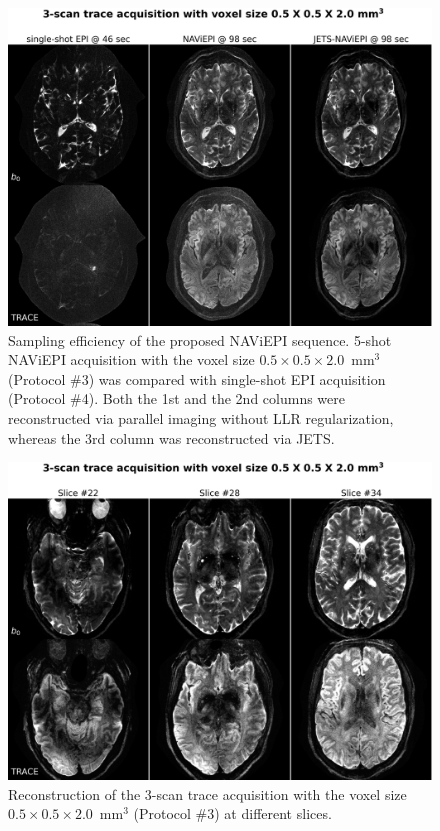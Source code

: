 \documentclass[preprint,12pt,authoryear,review]{elsarticle}
\begin{document}
    \begin{figure}
        \centering
        \includegraphics[width=\textwidth]{../figures/fig6.png}
        \caption{Sampling efficiency of the proposed NAViEPI sequence.
        5-shot NAViEPI acquisition with the voxel size
        $0.5\times0.5\times2.0$~mm$^3$ (Protocol \#3)
        was compared with single-shot EPI acquisition (Protocol \#4).
        Both the 1st and the 2nd columns were reconstructed
        via parallel imaging without LLR regularization,
        whereas the 3rd column was reconstructed via JETS.}
        \label{FIG:0.5mm_shots}
    \end{figure}


    \begin{figure}
        \centering
        \includegraphics[width=\textwidth]{../figures/fig7.png}
        \caption{Reconstruction of the 3-scan trace acquisition with
        the voxel size $0.5\times0.5\times2.0$~mm$^3$ (Protocol \#3)
        at different slices.}
        \label{FIG:0.5mm_slice}
    \end{figure}
\end{document}
